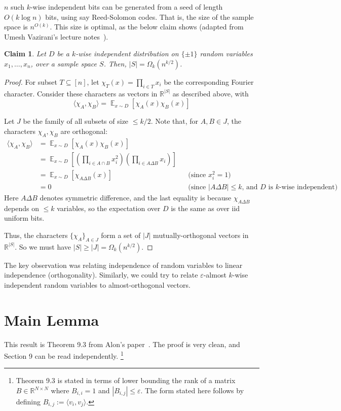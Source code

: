 \documentclass[]{article}
\newtheorem{claim}[theorem]{Claim}
\newcommand{\1}{\mathbb{1}}
\newcommand{\x}{\times}
\newcommand{\R}{\mathbb{R}}
\newcommand{\E}{\mathop{\mathbb{E}}}
\renewcommand{\epsilon}{\varepsilon}
\newcommand{\innp}[1]{\langle #1 \rangle}
\newcommand{\note}[1]{&&\text{(#1)}}
\begin{document}
$n$ such $k$-wise independent bits can be generated from a seed of length $O(k \log n)$ bits, using say Reed-Solomon codes.
That is, the size of the sample space is $n^{O(k)}$.
This size is optimal, as the below claim shows
(adapted from Umesh Vazirani's lecture notes~\cite{umesh_notes}).
\begin{claim}
    \label{claim:kwise}
    Let $D$ be a $k$-wise independent distribution on $\{\pm 1\}$ random
    variables $x_1, \dots, x_n$, over a sample space $S$.
    Then, $|S| = \Omega_k(n^{k / 2})$.
\end{claim}

\begin{proof}
    For subset $T \subseteq [n]$, let $\chi_T(x) = \prod_{i \in T} x_i$ be the
    corresponding Fourier character.
    Consider these characters as vectors in $\R^{|S|}$ as described above, with
    $$\innp{\chi_A, \chi_B} = \E_{x \sim D}[\chi_A(x)\chi_B(x)] $$

    Let $J$ be the family of all subsets of size $\leq k/2$.
    Note that, for $A, B \in J$, the characters $\chi_A, \chi_B$ are orthogonal:
    \begin{align*}
     \innp{\chi_A, \chi_B}
     &= \E_{x \sim D}[\chi_A(x)\chi_B(x)]\\
     &= \E_{x \sim D}[(\prod_{i \in A \cap B} x_i^2)(\prod_{i \in A \Delta B}
 x_i)]\\
 &= \E_{x \sim D}[\chi_{A \Delta B}(x)] \note{since $x_i^2 = 1$}\\
 &= 0 \note{since $|A \Delta B| \leq k$, and $D$ is $k$-wise independent}
\end{align*}
    Here $A \Delta B$ denotes symmetric difference, and the last equality
    is because $\chi_{A \Delta B}$ depends on $\leq k$
    variables, so the
    expectation over $D$ is the same as over iid uniform bits.

    Thus, the characters $\{\chi_A\}_{A \in J}$ form a set of
    $|J|$ mutually-orthogonal vectors in $\R^{|S|}$.
    So we must have $|S| \geq |J| = \Omega_k(n^{k/2})$.
\end{proof}

The key observation was relating independence of random
variables to linear independence (orthogonality).
Similarly, we could try to relate $\epsilon$-almost $k$-wise independent
random variables to almost-orthogonal vectors.

\section{Main Lemma}
This result is Theorem 9.3 from Alon's paper~\cite{alon03}.
The proof is very clean, and Section 9 can be read independently.
\footnote{
Theorem 9.3 is stated in terms of lower bounding the rank of a matrix $B \in
\R^{N \x N}$ where $B_{i,i} = 1$ and $|B_{i, j}| \leq \epsilon$.
The form stated here follows by defining $B_{i, j} := \innp{v_i, v_j}$.
}
\end{document}
